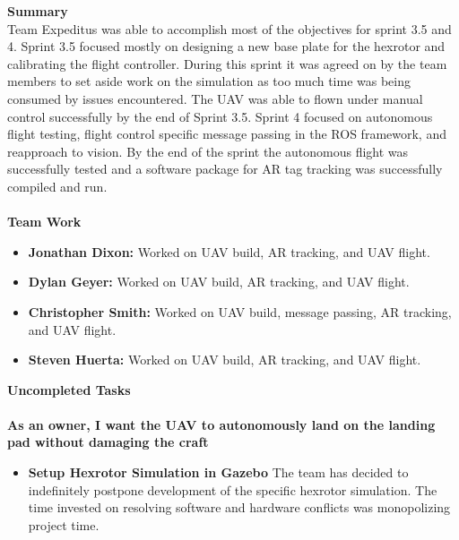 \noindent \Large{\textbf{Summary}}\\
\normalsize Team Expeditus was able to accomplish most of the objectives for sprint 3.5 and 4. Sprint 3.5 focused mostly on designing a new base plate for the hexrotor and calibrating the flight controller. During this sprint it was agreed on by the team members to set aside work on the simulation as too much time was being consumed by issues encountered. The UAV was able to flown under manual control successfully by the end of Sprint 3.5. Sprint 4 focused on autonomous flight testing, flight control specific message passing in the ROS framework, and reapproach to vision. By the end of the sprint the autonomous flight was successfully tested and a software package for AR tag tracking was successfully compiled and run.\\
\vspace{5mm}
\\
\noindent \Large{\textbf{Team Work}}
\normalsize
\begin{itemize}
\item \textbf{Jonathan Dixon:} Worked on UAV build, AR tracking, and UAV flight.
\item \textbf{Dylan Geyer:} Worked on UAV build, AR tracking, and UAV flight.
\item \textbf{Christopher Smith:} Worked on UAV build, message passing, AR tracking, and UAV flight. 
\item \textbf{Steven Huerta:} Worked on UAV build, AR tracking, and UAV flight. 
\end{itemize}

\vspace{5mm}
\noindent\Large{\textbf{Uncompleted Tasks}}\\
\vspace{2mm}\\
\noindent \large{\textbf{As an owner, I want the UAV to autonomously land on the landing pad without damaging the craft}}
\normalsize
\begin{itemize}
\item \textbf{Setup Hexrotor Simulation in Gazebo}
The team has decided to indefinitely postpone development of the specific hexrotor simulation. The time invested on resolving software and hardware conflicts was monopolizing project time.
\end{itemize} 

